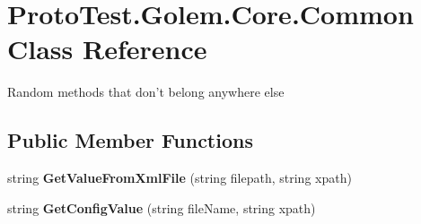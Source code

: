 \hypertarget{class_proto_test_1_1_golem_1_1_core_1_1_common}{\section{Proto\-Test.\-Golem.\-Core.\-Common Class Reference}
\label{class_proto_test_1_1_golem_1_1_core_1_1_common}
}


Random methods that don't belong anywhere else  


\subsection*{Public Member Functions}
\begin{DoxyCompactItemize}
\item 
\hypertarget{class_proto_test_1_1_golem_1_1_core_1_1_common_acbf7ce71f184e3b58d18589e0fca4d9d}{string {\bfseries Get\-Value\-From\-Xml\-File} (string filepath, string xpath)}\label{class_proto_test_1_1_golem_1_1_core_1_1_common_acbf7ce71f184e3b58d18589e0fca4d9d}

\item 
\hypertarget{class_proto_test_1_1_golem_1_1_core_1_1_common_a8aa2fc207d270a372ca219d5ad011eec}{string {\bfseries Get\-Config\-Value} (string file\-Name, string xpath)}\label{class_proto_test_1_1_golem_1_1_core_1_1_common_a8aa2fc207d270a372ca219d5ad011eec}

\end{DoxyCompactItemize}
